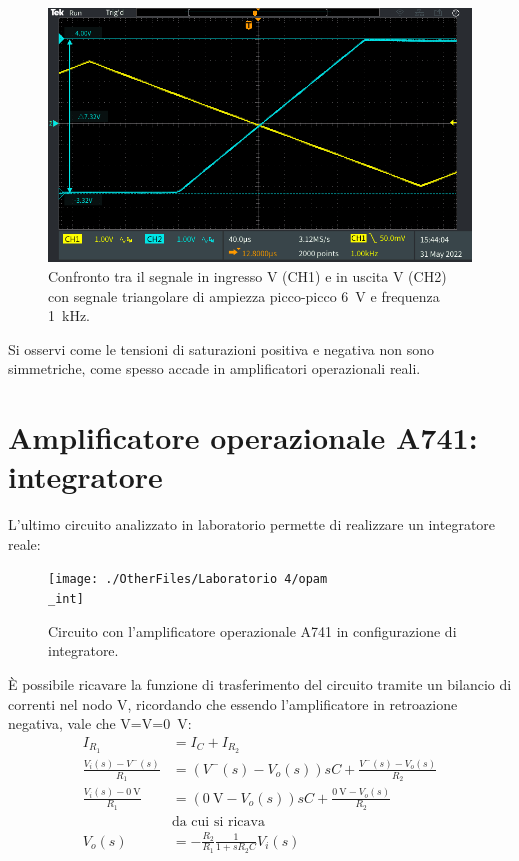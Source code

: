 \begin{figure}[h!]
	\centering
	\includegraphics[width=0.7\linewidth]{./ImageFiles/Laboratorio 4/TEK00015}
	\caption{Confronto tra il segnale in ingresso V (CH1)  e in uscita V (CH2) con segnale triangolare di ampiezza picco-picco \SI{6}{\volt} e frequenza \SI{1}{\kilo\hertz}.}
	\label{fig:opamp_inv_sat_tri}
\end{figure}

\noindent
Si osservi come le tensioni di saturazioni positiva e negativa non sono simmetriche, come spesso accade in amplificatori operazionali reali.

\clearpage
\section{Amplificatore operazionale \textmu A741: integratore}

L'ultimo circuito analizzato in laboratorio permette di realizzare un integratore reale:
\begin{figure}[h!]
	\centering
	\texttt{[image: ./OtherFiles/Laboratorio 4/opam\\\_int]}
	\caption{Circuito con l'amplificatore operazionale \textmu A741 in configurazione di integratore.}
	\label{fig:opamp_int}
\end{figure}

\noindent
\`E possibile ricavare la funzione di trasferimento del circuito tramite un bilancio di correnti nel nodo V\super{-}, ricordando che essendo l'amplificatore in retroazione negativa, vale che V\super{+}=V\super{-}=\SI{0}{\volt}:
\begin{equation}
	\begin{split}
		I_{R_1}&=I_{C}+I_{R_2} \\
		\frac{V_i(s)-V^-(s)}{R_1}&=(V^-(s)-V_o(s))sC+\frac{V^-(s)-V_o(s)}{R_2} \\
		\frac{V_i(s)-\SI{0}{\volt}}{R_1}&=(\SI{0}{\volt}-V_o(s))sC+\frac{\SI{0}{\volt}-V_o(s)}{R_2} \\
		&\text{da cui si ricava} \\
		V_o(s)&=-\frac{R_2}{R_1}\frac{1}{1+sR_2C}V_i(s)
	\end{split}
\end{equation}


